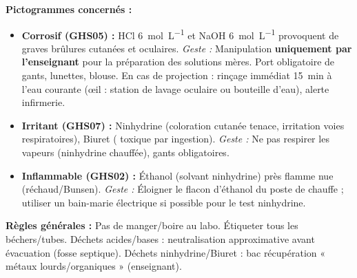 \documentclass[11pt]{article}
\newcounter{popsec}
\newcounter{popsub}
\newcommand{\courssub}[1]{%
  \stepcounter{popsub}%
  \par\vspace{9pt}\noindent{\popxbold\fontsize{11.5}{13}\selectfont\color{popink}{\color{poporange}\thepopsec.\thepopsub}\hspace{6pt}#1}\par\nopagebreak\vspace{4pt}
}
\begin{document}
\courssub{Sécurité}
\begin{attention}
\textbf{Pictogrammes concernés :}
\begin{itemize}
    \item \textbf{Corrosif (GHS05) :} HCl \SI{6}{mol.L^{-1}} et NaOH \SI{6}{mol.L^{-1}} provoquent de graves brûlures cutanées et oculaires. \emph{Geste :} Manipulation \textbf{uniquement par l'enseignant} pour la préparation des solutions mères. Port obligatoire de gants, lunettes, blouse. En cas de projection : rinçage immédiat \SI{15}{min} à l'eau courante (œil : station de lavage oculaire ou bouteille d'eau), alerte infirmerie.
    \item \textbf{Irritant (GHS07) :} Ninhydrine (coloration cutanée tenace, irritation voies respiratoires), Biuret ( toxique par ingestion). \emph{Geste :} Ne pas respirer les vapeurs (ninhydrine chauffée), gants obligatoires.
    \item \textbf{Inflammable (GHS02) :} Éthanol (solvant ninhydrine) près flamme nue (réchaud/Bunsen). \emph{Geste :} Éloigner le flacon d'éthanol du poste de chauffe ; utiliser un bain-marie électrique si possible pour le test ninhydrine.
\end{itemize}
\textbf{Règles générales :} Pas de manger/boire au labo. Étiqueter tous les béchers/tubes. Déchets acides/bases : neutralisation approximative avant évacuation (fosse septique). Déchets ninhydrine/Biuret : bac récupération « métaux lourds/organiques » (enseignant).
\end{attention}
\end{document}
